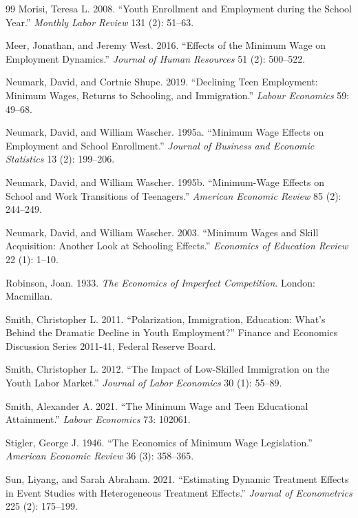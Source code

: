 \documentclass[12pt]{article}
\begin{document}
\begin{thebibliography}{99}
 Morisi, Teresa L. 2008. ``Youth Enrollment and Employment during the School Year.'' \textit{Monthly Labor Review} 131 (2): 51--63.

 Meer, Jonathan, and Jeremy West. 2016. ``Effects of the Minimum Wage on Employment Dynamics.'' \textit{Journal of Human Resources} 51 (2): 500--522.

 Neumark, David, and Cortnie Shupe. 2019. ``Declining Teen Employment: Minimum Wages, Returns to Schooling, and Immigration.'' \textit{Labour Economics} 59: 49--68.

 Neumark, David, and William Wascher. 1995a. ``Minimum Wage Effects on Employment and School Enrollment.'' \textit{Journal of Business and Economic Statistics} 13 (2): 199--206.

 Neumark, David, and William Wascher. 1995b. ``Minimum-Wage Effects on School and Work Transitions of Teenagers.'' \textit{American Economic Review} 85 (2): 244--249.

 Neumark, David, and William Wascher. 2003. ``Minimum Wages and Skill Acquisition: Another Look at Schooling Effects.'' \textit{Economics of Education Review} 22 (1): 1--10.

 Robinson, Joan. 1933. \textit{The Economics of Imperfect Competition}. London: Macmillan.

 Smith, Christopher L. 2011. ``Polarization, Immigration, Education: What's Behind the Dramatic Decline in Youth Employment?'' Finance and Economics Discussion Series 2011-41, Federal Reserve Board.

 Smith, Christopher L. 2012. ``The Impact of Low-Skilled Immigration on the Youth Labor Market.'' \textit{Journal of Labor Economics} 30 (1): 55--89.

 Smith, Alexander A. 2021. ``The Minimum Wage and Teen Educational Attainment.'' \textit{Labour Economics} 73: 102061.

 Stigler, George J. 1946. ``The Economics of Minimum Wage Legislation.'' \textit{American Economic Review} 36 (3): 358--365.

 Sun, Liyang, and Sarah Abraham. 2021. ``Estimating Dynamic Treatment Effects in Event Studies with Heterogeneous Treatment Effects.'' \textit{Journal of Econometrics} 225 (2): 175--199.


\end{thebibliography}
\end{document}
